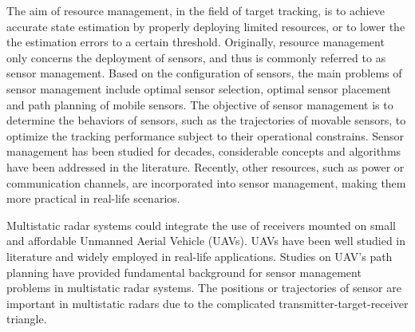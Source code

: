 \documentclass[12pt,journal,draftclsnofoot,onecolumn]{IEEEtran}
\begin{document}
 The aim of resource management, in the field of target tracking, is to achieve accurate state estimation by properly deploying limited resources, or to lower the the estimation errors to a certain threshold\cite{hero2011sensor}. Originally, resource management only concerns the deployment of sensors, and thus is commonly referred to as sensor management. Based on the configuration of sensors, the main problems of sensor management include optimal sensor selection\cite{tharmarasa2011decentralized,zhan2010adaptive,tharmarasa2009optimization}, optimal sensor placement\cite{xu2017optimal,nguyen2016optimal} and path planning of mobile sensors\cite{tharmarasa2009joint,he2019trajectory,huang2007static,scott2018illuminator}. The objective of sensor management is to determine the behaviors of sensors, such as the trajectories of movable sensors, to optimize the tracking performance subject to their operational constrains. Sensor management has been studied for decades, considerable concepts and algorithms have been addressed in the literature\cite{tharmarasa2007pcrlb,tharmarasa2011decentralized,hernandez2004multisensor,dogancay2007online,douganccay2010single}. Recently, other resources, such as power or communication channels, are incorporated into sensor management, making them more practical in real-life scenarios.

Multistatic radar systems could integrate the use of receivers mounted on small and affordable Unmanned Aerial Vehicle (UAVs). UAVs have been well studied in literature and widely employed in real-life applications\cite{pitre2012uav}. Studies on UAV's path planning have provided fundamental background for sensor management problems in multistatic radar systems. %
  The positions or trajectories of sensor are important in multistatic radars due to the complicated transmitter-target-receiver triangle.
\end{document}
